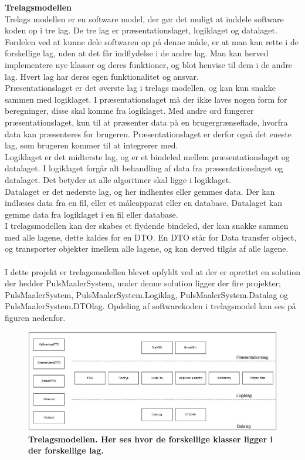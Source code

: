 \textbf{Trelagsmodellen} \\
Trelags modellen er en software model, der gør det muligt at inddele software koden op i tre lag. De tre lag er præsentationslaget, logiklaget og datalaget. \\
Fordelen ved at kunne dele softwaren op på denne måde, er at man kan rette i de forskellige lag, uden at det får indflydelse i de andre lag. Man kan herved implementere nye klasser og deres funktioner, og blot henvise til dem i de andre lag. Hvert lag har deres egen funktionalitet og ansvar.\\
Præsentationslaget er det øverste lag i trelags modellen, og kan kun snakke sammen med logiklaget. I præsentationslaget må der ikke laves nogen form for beregninger, disse skal komme fra logiklaget. Med andre ord fungerer præsentationslaget, kun til at præsenter data på en brugergrænseflade, hvorfra data kan præsenteres for brugeren. Præsentationslaget er derfor også det eneste lag, som brugeren kommer til at integrerer med.\\
Logiklaget er det midterste lag, og er et bindeled mellem præsentationslaget og datalaget. I logiklaget forgår alt behandling af data fra præsentationslaget og datalaget. Det betyder at alle algoritmer skal ligge i logiklaget. \\
Datalaget er det nederste lag, og her indhentes eller gemmes data. Der kan indlæses data fra en fil, eller et måleapparat eller en database. Datalaget kan gemme data fra logiklaget i en fil eller database. \\
I trelagsmodellen kan der skabes et flydende bindeled, der kan snakke sammen med alle lagene, dette kaldes for en DTO. En DTO står for Data transfer object, og transporter objekter imellem alle lagene, og kan derved tilgås af alle lagene. \\
\\
I dette projekt er trelagsmodellen blevet opfyldt ved at der er oprettet en solution der hedder PulsMaalerSystem, under denne solution ligger der fire projekter; PulsMaalerSystem, PulsMaalerSystem.Logiklag, PulsMaalerSystem.Datalag og PulsMaalerSystem.DTOlag. Opdeling af softwarekoden i trelagsmodel kan ses på figuren nedenfor. 
\begin{figure}[H]
\includegraphics[width =1.0\textwidth , center]{billeder/Trelagsmodel}
\caption{\textbf{Trelagsmodellen. Her ses hvor de forskellige klasser ligger i der forskellige lag.}}
\end{figure}
